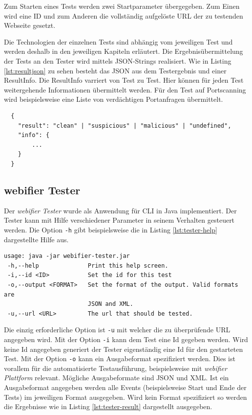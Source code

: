 Zum Starten eines Tests werden zwei Startparameter übergegeben. Zum Einen wird eine ID und zum
Anderen die vollständig aufgelöste URL der zu testenden Webseite gesetzt.

Die Technologien der einzelnen Tests sind abhängig vom jeweiligen Test und werden deshalb in den
jeweiligen Kapiteln erläutert. Die Ergebnisübermittelung der Tests an den Tester wird mittels
\ac{JSON}-Strings realisiert. Wie in Listing \ref{lst:resultjson} zu sehen besteht das \ac{JSON} aus dem
Testergebnis und einer ResultInfo. Die ResultInfo varriert von Test zu Test. Hier können für jeden
Test weitergehende Informationen übermittelt werden. Für den Test auf Portscanning wird
beispielsweise eine Liste von verdächtigen Portanfragen übermittelt.

\begin{scriptsize}
\begin{lstlisting}
  {
  	"result": "clean" | "suspicious" | "malicious" | "undefined",
  	"info": {
  		...
  	}
  }
\end{lstlisting}
\end{scriptsize}

\subsection{webifier Tester}

Der \textit{webifier Tester} wurde als Anwendung für \ac{CLI} in Java implementiert. Der Tester
kann mit Hilfe verschiedener Parameter in seinem Verhalten gesteuert werden. Die Option
\lstinline[style=eclipse]{-h} gibt beispielsweise die in Listing \ref{lst:tester-help} dargestellte
Hilfe aus.

\begin{scriptsize}
\begin{lstlisting}
usage: java -jar webifier-tester.jar
 -h,--help              Print this help screen.
 -i,--id <ID>           Set the id for this test
 -o,--output <FORMAT>   Set the format of the output. Valid formats are
                        JSON and XML.
 -u,--url <URL>         The url that should be tested.
\end{lstlisting}
\end{scriptsize}

Die einzig erforderliche Option ist \lstinline[style=eclipse]{-u} mit welcher die zu überprüfende
\acs{URL} angegeben wird. Mit der Option \lstinline[style=eclipse]{-i} kann dem Test eine Id gegeben
werden. Wird keine Id angegeben generiert der Tester eigenständig eine Id für den gestarteten Test.
Mit der Option \lstinline[style=eclipse]{-o} kann ein Ausgabeformat spezifiziert werden. Dies ist
vorallem für die automatisierte Testausführung, beispielsweise mit \textit{webifier Plattform}
relevant. Mögliche Ausgabeformate sind \ac{JSON} und \ac{XML}. Ist ein Ausgabeformat angegeben
werden alle Events (beispielsweise Start und Ende der Tests) im jeweiligen Format ausgegeben. Wird
kein Format spezifiziert so werden die Ergebnisse wie in Listing \ref{lst:tester-result}
dargestellt ausgegeben.

